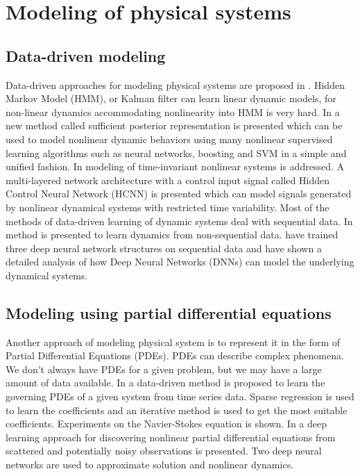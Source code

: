 \documentclass[conference]{IEEEtran}
\begin{document}
\section{Modeling of physical systems}

\subsection{\textbf{Data-driven modeling}}

Data-driven approaches for modeling physical systems are proposed in \cite{langford2009nonlinear, levin1991nips, john2009nonlinear, ogunmolu2016nonlinear}.  Hidden Markov Model (HMM), or Kalman filter can learn linear dynamic models, for non-linear dynamics accommodating nonlinearity into HMM is very hard. In \cite{langford2009nonlinear} a new method called sufficient posterior representation is presented which can be used to model nonlinear dynamic behaviors using many nonlinear supervised learning algorithms such as neural networks, boosting and SVM in a simple and unified fashion. In \cite{levin1991nips} modeling of time-invariant nonlinear systems is addressed. A multi-layered network architecture with a control input signal called Hidden Control Neural Network (HCNN) is presented which can model signals generated by nonlinear dynamical systems with restricted time variability. Most of the methods of data-driven learning of dynamic systems deal with sequential data. In \cite{john2009nonlinear} method is presented to learn dynamics from non-sequential data. \cite{ogunmolu2016nonlinear} have trained three deep neural network structures on sequential data and have shown a detailed analysis of how Deep Neural Networks (DNNs) can model the underlying dynamical systems.

\subsection{\textbf{Modeling using partial differential equations}}

Another approach of modeling physical system is to represent it in the form of Partial Differential Equations (PDEs). PDEs can describe complex phenomena. We don't always have PDEs for a given problem, but we may have a large amount of data available. In \cite{rudy2017datadriven} a data-driven method is proposed to learn the governing PDEs of a given system from time series data. Sparse regression is used to learn the coefficients and an iterative method is used to get the most suitable coefficients. Experiments on the Navier-Stokes equation is shown. In \cite{raissi2018deep} a deep learning approach for discovering nonlinear partial differential equations from scattered and potentially noisy observations is presented. Two deep neural networks are used to approximate solution and nonlinear dynamics.
\end{document}
